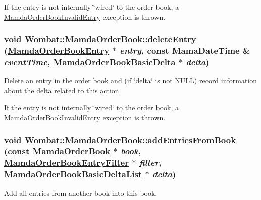 If the entry is not internally \char`\"{}wired\char`\"{} to the order book, a \hyperlink{classWombat_1_1MamdaOrderBookInvalidEntry}{Mamda\-Order\-Book\-Invalid\-Entry} exception is thrown. \hypertarget{classWombat_1_1MamdaOrderBook_027cf7c0439c3952475a678ddbf26f60}{
\subsubsection[deleteEntry]{\setlength{\rightskip}{0pt plus 5cm}void Wombat::Mamda\-Order\-Book::delete\-Entry (\hyperlink{classWombat_1_1MamdaOrderBookEntry}{Mamda\-Order\-Book\-Entry} $\ast$ {\em entry}, const Mama\-Date\-Time \& {\em event\-Time}, \hyperlink{classWombat_1_1MamdaOrderBookBasicDelta}{Mamda\-Order\-Book\-Basic\-Delta} $\ast$ {\em delta})}}
\label{classWombat_1_1MamdaOrderBook_027cf7c0439c3952475a678ddbf26f60}


Delete an entry in the order book and (if \char`\"{}delta\char`\"{} is not NULL) record information about the delta related to this action. 

If the entry is not internally \char`\"{}wired\char`\"{} to the order book, a \hyperlink{classWombat_1_1MamdaOrderBookInvalidEntry}{Mamda\-Order\-Book\-Invalid\-Entry} exception is thrown. \hypertarget{classWombat_1_1MamdaOrderBook_4c008315083016a87016cf2078bd3a83}{
\subsubsection[addEntriesFromBook]{\setlength{\rightskip}{0pt plus 5cm}void Wombat::Mamda\-Order\-Book::add\-Entries\-From\-Book (const \hyperlink{classWombat_1_1MamdaOrderBook}{Mamda\-Order\-Book} $\ast$ {\em book}, \hyperlink{classWombat_1_1MamdaOrderBookEntryFilter}{Mamda\-Order\-Book\-Entry\-Filter} $\ast$ {\em filter}, \hyperlink{classWombat_1_1MamdaOrderBookBasicDeltaList}{Mamda\-Order\-Book\-Basic\-Delta\-List} $\ast$ {\em delta})}}
\label{classWombat_1_1MamdaOrderBook_4c008315083016a87016cf2078bd3a83}


Add all entries from another book into this book. 

